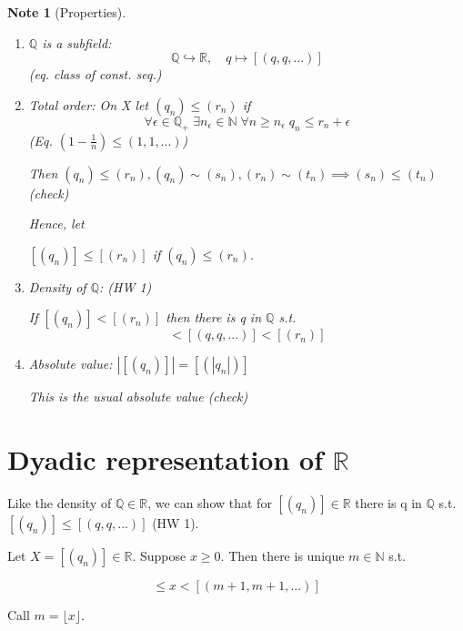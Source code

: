 \documentclass[11pt, oneside]{book}
\theoremstyle{break}
\newtheorem*{note}{Note}
\newcommand{\bb}[1]{\mathbb{#1}}			%
\newcommand{\floor}[1]{\lfloor #1 \rfloor}	%
\begin{document}
\begin{note}[Properties]
	\begin{enumerate}
		\item $\bb{Q}$ is a subfield:
			\begin{equation}
				\bb{Q} \hookrightarrow \bb{R}, \quad q \mapsto [(q, q, ... )]
			\end{equation}
			(eq. class of const. seq.)
		\item Total order: On X let $(q_n) \leq (r_n)$ if
			\begin{equation}
				\forall \epsilon \in \bb{Q}_+ \; \exists n_\epsilon \in \bb{N} \; \forall n \geq n_\epsilon \; q_n \leq r_n + \epsilon
			\end{equation}
			(Eq. $(1 - \frac{1}{n}) \leq (1, 1, ...)$)

			Then $(q_n) \leq (r_n), (q_n) \sim (s_n), (r_n) \sim (t_n) \implies (s_n) \leq (t_n)$ (check)

			Hence, let 

			$[(q_n)] \leq [(r_n)]$ if $(q_n) \leq (r_n)$.
		\item Density of $\bb{Q}$: (HW 1)

			If $[(q_n)] < [(r_n)]$ then there is q in $\bb{Q}$ s.t.
			\begin{equation}
				[(q_n)] < [(q, q, ...)] < [(r_n)]
			\end{equation}
		\item Absolute value: $|[(q_n)]| = [(|q_n|)]$

			This is the usual absolute value (check)
	\end{enumerate}
	
\end{note}

\section{Dyadic representation of \texorpdfstring{$\bb{R}$}{R}}\label{sect:dyadic_R}

Like the density of $\bb{Q} \in \bb{R}$, we can show that for $[(q_n)] \in \bb{R}$ there is q in $\bb{Q}$ s.t. $[(q_n)] \leq [(q, q, ...)]$ (HW 1).

Let $X = [(q_n)] \in \bb{R}$. Suppose $x \geq 0$. Then there is unique $m \in \bb{N}$ s.t.

\begin{equation}
	[(m, m, ...)] \leq x < [(m + 1, m + 1, ...)]
\end{equation}

Call $m = \floor{x}$.
\end{document}
